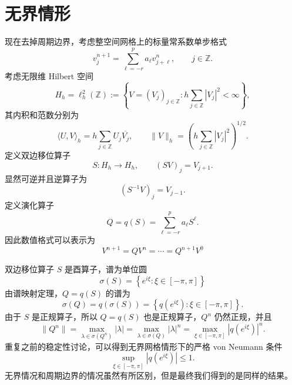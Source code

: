 \section{无界情形}

现在去掉周期边界，考虑整空间网格上的标量常系数单步格式
\[
    v_j^{n+1}
    =
    \sum_{\ell=-r}^{p}a_\ell v_{j+\ell}^n,
    \qquad j\in\mathbb Z.
\]
考虑无限维 Hilbert 空间
\[
    H_h=\ell_h^2(\mathbb Z)
    :=
    \left\{
        V=(V_j)_{j\in\mathbb Z}:
        h\sum_{j\in\mathbb Z}|V_j|^2<\infty
    \right\},
\]
其内积和范数分别为
\[
    \langle U,V\rangle_h
    =
    h\sum_{j\in\mathbb Z}U_j\overline{V_j},
    \qquad
    \|V\|_h
    =
    \left(
        h\sum_{j\in\mathbb Z}|V_j|^2
    \right)^{1/2}.
\]
定义双边移位算子
\[
    S:H_h\to H_h,
    \qquad
    (SV)_j=V_{j+1}.
\]
显然可逆并且逆算子为
\[
    (S^{-1}V)_j=V_{j-1}.
\]
定义演化算子
\[
    Q = q(S) = \sum_{\ell=-r}^{p}a_\ell S^\ell.
\]
因此数值格式可以表示为
\[
    V^{n+1} = Q V^n = \cdots = Q^{n+1} V^0
\]

双边移位算子 $S$ 是酉算子，谱为单位圆
\[
    \sigma(S)
    =
    \left\{
        e^{i \xi}:
        \xi\in[-\pi,\pi]
    \right\}
\]
由谱映射定理，$Q=q(S)$ 的谱为
\[
    \sigma(Q)
    =
    q(\sigma(S))
    =
    \left\{
        q(e^{i \xi}):
        \xi\in[-\pi,\pi]
    \right\}.
\]
由于 $S$ 是正规算子，所以 $Q=q(S)$ 也是正规算子，$Q^n$ 仍然正规，并且
\[
    \|Q^n\| = \max_{\lambda\in\sigma(Q^n)}|\lambda| = \max_{\lambda\in\sigma(Q)}|\lambda|^n = \max_{\xi\in[-\pi,\pi]}|q(e^{i\xi})|^n.
\]
重复之前的稳定性讨论，可以得到无界网格情形下的严格 von Neumann 条件
\[
    \sup_{\xi\in[-\pi,\pi]}
    |q(e^{i\xi})|
    \leq1.
\]
无界情况和周期边界的情况虽然有所区别，但是最终我们得到的是同样的结果。
